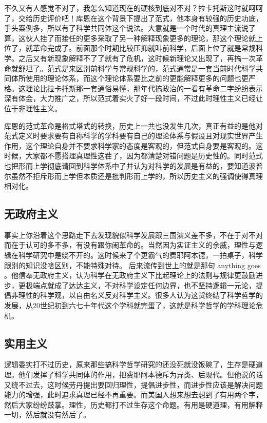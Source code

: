 \documentclass[]{tufte-book}
\begin{document}
不久又有人感觉不对了，我怎么知道现在的硬核到底对不对？拉卡托斯这时就呵呵了，交给历史评价吧！库恩在这个背景下提出了范式，他本身有较强的历史功底，手头案例多，所以有了科学共同体这个说法。大意就是一个时代的真理主流说了算，这伙人挂了而接任的更多采取了另一种解释现象更多的理论，那这个理论就上位了，就革命完成了。前面那个时期比较压抑就叫前科学，后面上位了就是常规科学。之后又有新现象解释不了了就有了危机，这时候新理论又出现了，再搞一次革命就舒坦了。范式是来区别前科学与常规科学的，范式通常是一套当前时代科学共同体所使用的理论体系，而这个理论体系要比之前的更能解释更多的问题也更严格。这理论比拉卡托斯那一套通俗易懂，那年代搞政治的一看有革命二字纷纷表示深有体会，大力推广之，所以范式着实火了好一段时间，不过此时理性主义已经让位于非理性主义。

库恩的范式革命是格式塔式的转换，历史上一共也没发生几次，真正有益的是他对范式定义时要求要有自称科学的学科要有自己的理论体系与假设且对现实世界产生作用，这个理论自身并不要求科学家的态度是客观的，但范式自身要是客观的。这时候，大家都不愿搭理真理性这茬了，因为都清楚对错问题是历史性的。同时范式也把形而上学彻底请回到科学体系中了并认为对科学的发展是有益的，要知道波普尔虽然不拒斥形而上学但本质还是批判形而上学的，所以历史主义的强调使得真理相对化。

\hypertarget{ux65e0ux653fux5e9cux4e3bux4e49}{%
\subsection{无政府主义}\label{ux65e0ux653fux5e9cux4e3bux4e49}}

事实上你沿着这个思路走下去发现貌似科学发展跟三国演义差不多，不在于对不对而在于认可的多不多，有没有跟你闹革命的。当然因为实证主义的余威，理性与逻辑在科学研究中是绕不开的。这时候来了个更霸气的费耶阿本德，一拍桌子，科学跟别的知识没啥区别，不能特殊对待。 后来流传到世上的就是那句 anything goes 。他信奉无政府主义，认为科学在无政府主义下比起理论上的法则与规律更鼓励进步，更极端点就成了达达主义，不对科学设定任何边界，也不坚持逻辑一元论，提倡非理性的科学观，以自由名义反对科学主义。很多人认为这货终结了科学哲学的发展，从20世纪初到六七十年代这个学科就完蛋了，这就是科学哲学的学科理论危机。

\hypertarget{ux5b9eux7528ux4e3bux4e49}{%
\subsection{实用主义}\label{ux5b9eux7528ux4e3bux4e49}}

逻辑委实打不过历史，原来那些搞科学哲学研究的还没死就没饭碗了，生存是硬道理。他们发挥了科学共同体的作用，把费耶阿本德斥为异类、后现代。但他说的话又绕不过去，这时候劳丹提出要回归理性，提倡进步性，而进步性应该是解决问题能力的增强，此时追求真理已经不再重要。而美国人想来想去想到了有用两个字，然后大家纷纷鼓掌。理性，历史都打不过生存这个命题。有用是硬道理，有用解释一切，然后就没有然后了。
\end{document}
